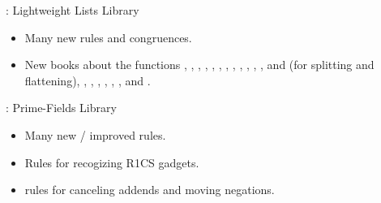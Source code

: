 
\begin{frame}

\implibtitle

: Lightweight Lists Library

\begin{itemize}

\item Many new rules and congruences.

\item New books about the functions , , , , , , , , , , , ,  and  (for splitting and flattening), , , , , , , and .

\end{itemize}

\end{frame}


\begin{frame}

\implibtitle

: Prime-Fields Library

\begin{itemize}

\item Many new / improved rules.

\item Rules for recogizing R1CS gadgets.

\item {} rules for canceling addends and moving negations.

\end{itemize}

\end{frame}


